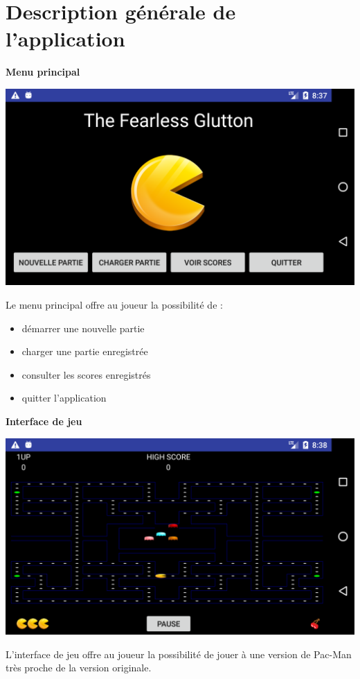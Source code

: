 \documentclass{article}
\begin{document}
\section{Description générale de l'application}
\textbf{Menu principal}
\begin{center}
  \includegraphics[scale=0.25]{MainMenuActivity.png}
\end{center}
Le menu principal offre au joueur la possibilité de :
\begin{itemize}
\item démarrer une nouvelle partie
\item charger une partie enregistrée
\item consulter les scores enregistrés
\item quitter l’application
\end{itemize}

\bigskip

\textbf{Interface de jeu}
\begin{center}
  \includegraphics[scale=0.25]{GameActivity.png}
\end{center}
L'interface de jeu offre au joueur la possibilité de jouer à une version de Pac-Man très proche de la version originale.
\end{document}
